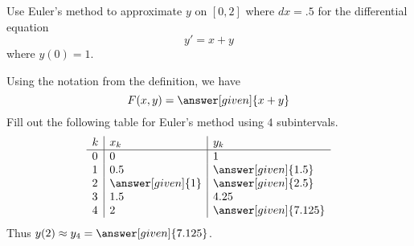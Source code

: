 \documentclass{ximera}
\begin{document}
\begin{example}
Use Euler's method to approximate $y$ on $[0,2]$ where $dx = .5$ for
the differential equation
\[
y'=x+y
\]
where $y(0) = 1$.
\begin{explanation}
Using the notation from the definition, we have
\[
F(x,y) = \answer[given]{x+y}
\]
Fill out the following table for Euler's method using $4$
subintervals.
\[
\begin{array}{l|l|l}
  k & x_k & y_k \\ \hline
  0 & 0   & 1 \\
  1 & 0.5 & \answer[given]{1.5} \\
  2 & \answer[given]{1} & \answer[given]{2.5}  \\
  3 & 1.5 & 4.25 \\
  4 & 2 & \answer[given]{7.125}
\end{array}
\]
Thus $y(2) \approx y_4 =\answer[given]{7.125}$.
\end{explanation}
\end{example}
\end{document}
